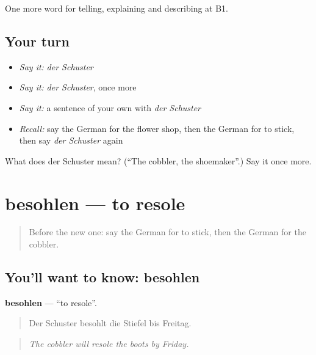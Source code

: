 \begin{grammarlens}[title={What you've built}]
One more word for telling, explaining and describing at B1.
\end{grammarlens}

\subsection*{Your turn}
\begin{itemize}
\raggedright
  \item \emph{Say it:} \emph{der Schuster}
  \item \emph{Say it:} \emph{der Schuster}, once more
  \item \emph{Say it:} a sentence of your own with \emph{der Schuster}
  \item \emph{Recall:} say the German for the flower shop, then the German for to stick, then say \emph{der Schuster} again
\end{itemize}

\begin{tcolorbox}[breakable,colback=teal!4,colframe=teal!35!black,title={Before you move on}]
What does der Schuster mean? (\textquotedblleft{}The cobbler, the shoemaker\textquotedblright{}.) Say it once more.
\end{tcolorbox}
\section[besohlen]{besohlen — to resole}

\label{lesson:GE-C445-besohlen}



\begin{quote}
Before the new one: say the German for to stick, then the German for the cobbler.
\end{quote}

\subsection*{You'll want to know: besohlen}
\textbf{besohlen} — \textquotedblleft{}to resole\textquotedblright{}.

\begin{quote}
Der Schuster besohlt die Stiefel bis Freitag.
\end{quote}

\begin{quote}
\emph{The cobbler will resole the boots by Friday.}
\end{quote}

